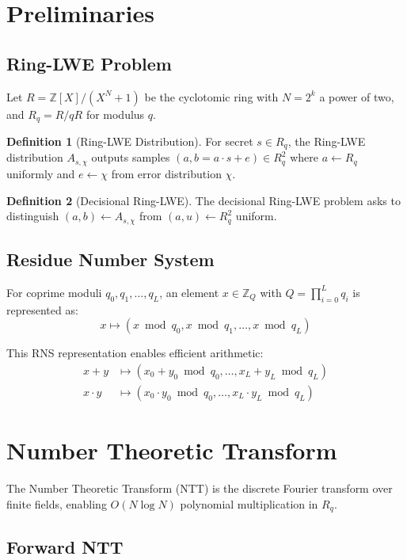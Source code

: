\documentclass[11pt,a4paper]{article}
\theoremstyle{definition}
\newtheorem{definition}{Definition}
\begin{document}
\section{Preliminaries}

\subsection{Ring-LWE Problem}

Let $R = \mathbb{Z}[X]/(X^N + 1)$ be the cyclotomic ring with $N = 2^k$ a power of two, and $R_q = R/qR$ for modulus $q$.

\begin{definition}[Ring-LWE Distribution]
For secret $s \in R_q$, the Ring-LWE distribution $A_{s,\chi}$ outputs samples $(a, b = a \cdot s + e) \in R_q^2$ where $a \leftarrow R_q$ uniformly and $e \leftarrow \chi$ from error distribution $\chi$.
\end{definition}

\begin{definition}[Decisional Ring-LWE]
The decisional Ring-LWE problem asks to distinguish $(a, b) \leftarrow A_{s,\chi}$ from $(a, u) \leftarrow R_q^2$ uniform.
\end{definition}

\subsection{Residue Number System}

For coprime moduli $q_0, q_1, \ldots, q_L$, an element $x \in \mathbb{Z}_Q$ with $Q = \prod_{i=0}^{L} q_i$ is represented as:
\[
x \mapsto (x \bmod q_0, x \bmod q_1, \ldots, x \bmod q_L)
\]

This RNS representation enables efficient arithmetic:
\begin{align}
x + y &\mapsto (x_0 + y_0 \bmod q_0, \ldots, x_L + y_L \bmod q_L) \\
x \cdot y &\mapsto (x_0 \cdot y_0 \bmod q_0, \ldots, x_L \cdot y_L \bmod q_L)
\end{align}

\section{Number Theoretic Transform}

The Number Theoretic Transform (NTT) is the discrete Fourier transform over finite fields, enabling $O(N \log N)$ polynomial multiplication in $R_q$.

\subsection{Forward NTT}
\end{document}
